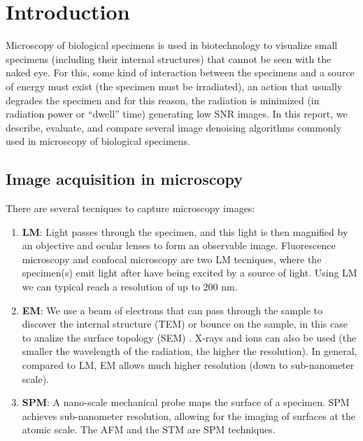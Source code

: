 \chapter{Introduction}

Microscopy of biological specimens is used in biotechnology to
visualize small specimens (including their internal structures) that
cannot be seen with the naked eye. For this, some kind of interaction
between the specimens and a source of energy must exist (the specimen
must be irradiated), an action that usually degrades the specimen and
for this reason, the radiation is minimized (in radiation power or
``dwell'' time) generating low SNR images. In this report, we describe,
evaluate, and compare several image denoising algorithms commonly used
in microscopy of biological specimens.

\section{Image acquisition in microscopy}

There are several tecniques to capture microscopy images:

\begin{enumerate}
  \item \textbf{\gls{LM}}: Light passes through the specimen, and this light
  is then magnified by an objective and ocular lenses to form an
  observable image. Fluorescence microscopy and confocal microscopy
  are two \gls{LM} tecniques, where the specimen(s) emit light after
  have being excited by a source of light. Using \gls{LM} we can
  typical reach a resolution of up to 200 nm.

\item \textbf{\gls{EM}}: We use a beam of electrons that can pass
  through the sample to discover the internal structure (\gls{TEM}) or
  bounce on the sample, in this case to analize the surface topology
  (\gls{SEM}) \cite{timischl2012statistical}. X-rays and ions can also
  be used (the smaller the wavelength of the radiation, the higher the
  resolution). In general, compared to \gls{LM}, \gls{EM} allows much
  higher resolution (down to sub-nanometer scale).

\item \textbf{\gls{SPM}}: A nano-scale mechanical probe maps the surface of a
  specimen. \gls{SPM} achieves sub-nanometer resolution, allowing for
  the imaging of surfaces at the atomic scale. The \gls{AFM} and the
  \gls{STM} are \gls{SPM} techniques.
\end{enumerate}
  
